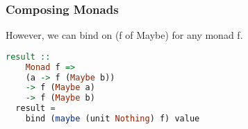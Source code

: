 \begin{frame}[fragile]
\frametitle{Composing Monads}
However, we can bind on (f of Maybe) for any monad f.

\begin{lstlisting}[language=haskell]
  result ::
    Monad f =>
    (a -> f (Maybe b))
    -> f (Maybe a)
    -> f (Maybe b)
  result =
    bind (maybe (unit Nothing) f) value
\end{lstlisting}
\end{frame}
